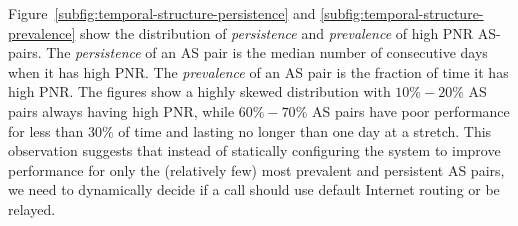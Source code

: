

Figure~\ref{subfig:temporal-structure-persistence} and 
\ref{subfig:temporal-structure-prevalence} show the 
distribution of {\em persistence} and {\em prevalence} of 
high PNR AS-pairs. 
The {\em persistence} of an AS pair is the median 
number of consecutive days when it has high PNR. 
The {\em prevalence} of an AS pair is the fraction of 
time it has high PNR.
The figures show a highly skewed distribution with 
$10\%-20\%$ AS pairs always having high PNR, while 
$60\%-70\%$ AS pairs have poor performance for less 
than $30\%$ of time and lasting no longer than one 
day at a stretch. 
This observation suggests that instead of statically 
configuring the system to improve performance for 
only the (relatively few) most prevalent and persistent 
AS pairs, we need to dynamically decide if a call 
should use default Internet routing or be relayed. %


